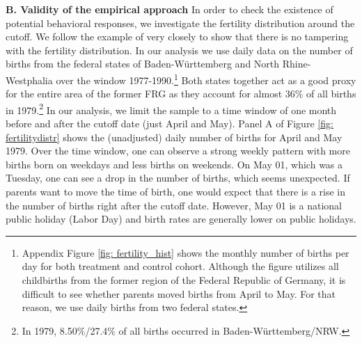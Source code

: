 \documentclass[11pt, a4paper]{article} %
\begin{document}
\bigskip\bigskip
\textbf{B. Validity of the empirical approach}\newline 
In order to check the existence of potential behavioral responses, we investigate the fertility distribution around the cutoff. We follow the example of \cite{gans2009born} very closely to show that there is no tampering with the fertility distribution. In our analysis we use daily data on the number of births from the federal states of Baden-Württemberg and North Rhine-Westphalia over the window 1977-1990.\footnote{Appendix Figure \ref{fig: fertility_hist} shows the monthly number of births per day for both treatment and control cohort. Although the figure utilizes all childbirths from the former region of the Federal Republic of Germany, it is difficult to see whether parents moved births from April to May. For that reason, we use daily births from two federal states.} Both states together act as a good proxy for the entire area of the former FRG as they account for almost 36\% of all births in 1979.\footnote{In 1979, 8.50\%/27.4\% of all births occurred in Baden-Württemberg/NRW.} In our analysis, we limit the sample to a time window of one month before and after the cutoff date (just April and May). Panel A of Figure \ref{fig: fertilitydistr} shows the (unadjusted) daily number of births for April and May 1979. Over the time window, one can observe a strong weekly pattern with more births born on weekdays and less births on weekends. On May 01, which was a Tuesday, one can see a drop in the number of births, which seems unexpected. If parents want to move the time of birth, one would expect that there is a rise in the number of births right after the cutoff date. However, May 01 is a national public holiday (Labor Day) and birth rates are generally lower on public holidays. \newline 
\end{document}
